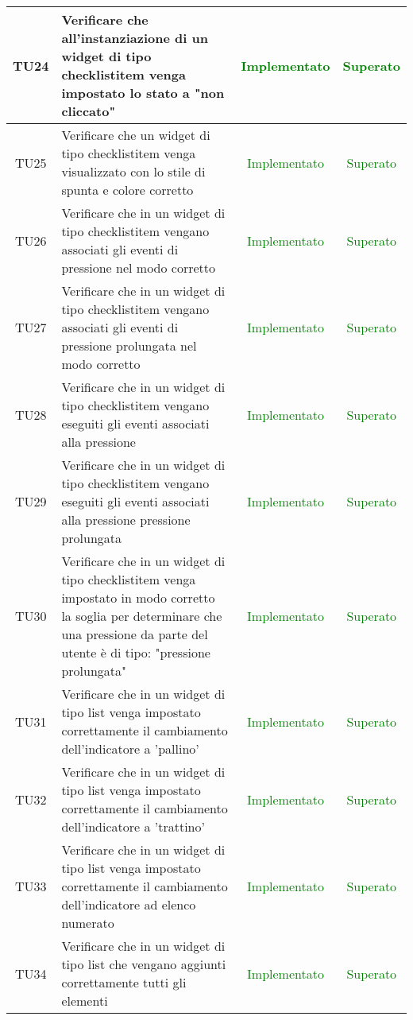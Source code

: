 \begin{center}
\begin{longtable}{|c|>{\centering}m{10cm}|c|c|}
		TU24 & Verificare che all'instanziazione di un widget di tipo checklistitem venga impostato lo stato a "non cliccato" & \textcolor{Green}{Implementato} & \textcolor{Green}{Superato} \\ \hline
		TU25 & Verificare che un widget di tipo checklistitem venga visualizzato con lo stile di spunta e colore corretto & \textcolor{Green}{Implementato} & \textcolor{Green}{Superato} \\ \hline
		TU26 & Verificare che in un widget di tipo checklistitem vengano associati gli eventi di pressione nel modo corretto & \textcolor{Green}{Implementato} & \textcolor{Green}{Superato} \\ \hline
		TU27 & Verificare che in un widget di tipo checklistitem vengano associati gli eventi di pressione prolungata nel modo corretto & \textcolor{Green}{Implementato} & \textcolor{Green}{Superato} \\ \hline
		TU28 & Verificare che in un widget di tipo checklistitem vengano eseguiti gli eventi associati alla pressione & \textcolor{Green}{Implementato} & \textcolor{Green}{Superato} \\ \hline
		TU29 & Verificare che in un widget di tipo checklistitem vengano eseguiti gli eventi associati alla pressione pressione prolungata & \textcolor{Green}{Implementato} & \textcolor{Green}{Superato} \\ \hline
		TU30 & Verificare che in un widget di tipo checklistitem venga impostato in modo corretto la soglia per determinare che una pressione da parte del utente è di tipo: "pressione prolungata" & \textcolor{Green}{Implementato} & \textcolor{Green}{Superato} \\ \hline
		TU31 & Verificare che in un widget di tipo list venga impostato correttamente il cambiamento dell'indicatore a 'pallino' & \textcolor{Green}{Implementato} & \textcolor{Green}{Superato} \\ \hline
		TU32 & Verificare che in un widget di tipo list venga impostato correttamente il cambiamento dell'indicatore a 'trattino' & \textcolor{Green}{Implementato} & \textcolor{Green}{Superato} \\ \hline
		TU33 & Verificare che in un widget di tipo list venga impostato correttamente il cambiamento dell'indicatore ad elenco numerato & \textcolor{Green}{Implementato} & \textcolor{Green}{Superato} \\ \hline
		TU34 & Verificare che in un widget di tipo list che vengano aggiunti correttamente tutti gli elementi & \textcolor{Green}{Implementato} & \textcolor{Green}{Superato} \\ \hline

\end{longtable}
\end{center}

